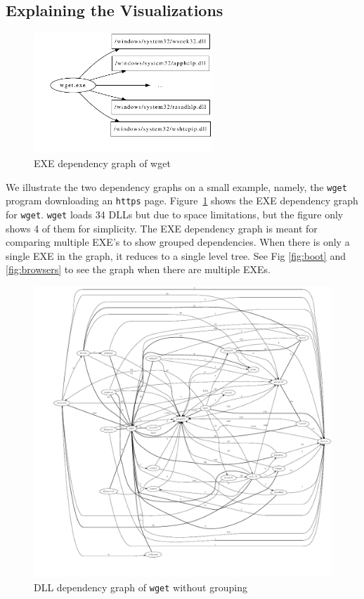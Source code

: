 \subsection{Explaining the Visualizations}

\begin{figure}[tbh]
\centering
\includegraphics[width=0.6\textwidth]{depvis/wget-exe-split.pdf}
\caption{EXE dependency graph of wget}
\label{fig:wget-exe-split}
\end{figure}

We illustrate the two dependency graphs on a small example, namely, the
{\tt wget} program downloading an {\tt https} page.
Figure~\ref{fig:wget-exe-split} shows the EXE dependency graph for {\tt wget}.
{\tt wget} loads 34 DLLs but due to space limitations,
but the figure only shows 4 of them for simplicity.
The EXE dependency graph is meant for comparing multiple EXE's to show
grouped dependencies.
When there is only a single EXE in the graph, it reduces to a single level
tree. See Fig \ref{fig:boot} and \ref{fig:browsers} to see the graph
when there are multiple EXEs.

\begin{figure}[htb]
\centering
\includegraphics[width=1.0\textwidth]{depvis/wget-nogroup.pdf}
\caption{DLL dependency graph of {\tt wget} without grouping}
\label{fig:wget-nogroup}
\end{figure}

